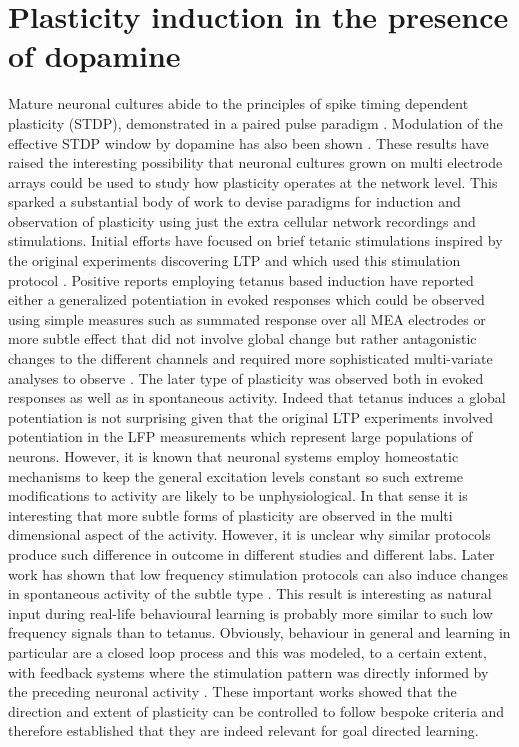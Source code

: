     \section{Plasticity induction in the presence of dopamine}
    Mature neuronal cultures abide to the principles of spike timing dependent plasticity (STDP), demonstrated in a paired pulse paradigm \cite{bi1998synaptic}. Modulation of the effective STDP window by dopamine has also been shown \cite{zhang2009gain}. These results have raised the interesting possibility that neuronal cultures grown on multi electrode arrays could be used to study how plasticity operates at the network level. This sparked a substantial body of work to devise paradigms for induction and observation of plasticity using just the extra cellular network recordings and stimulations. Initial efforts have focused on brief tetanic stimulations inspired by the original experiments discovering LTP and which used this stimulation protocol \cite{bliss1973long}. Positive reports employing tetanus based induction have reported either a generalized potentiation in evoked responses which could be observed using simple measures such as summated response over all MEA electrodes \cite{chiappalone2008network,hamilton2015time,ruaro2005toward} or more subtle effect that did not involve global change but rather antagonistic changes to the different channels and required more sophisticated multi-variate analyses to observe \cite{jimbo1999simultaneous,le2015repeated,madhavan2007plasticity}. The later type of plasticity was observed both in evoked responses as well as in spontaneous activity. Indeed that tetanus induces a global potentiation is not surprising given that the original LTP experiments involved potentiation in the LFP measurements which represent large populations of neurons. However, it is known that neuronal systems employ homeostatic mechanisms to keep the general excitation levels constant \cite{turrigiano1999homeostatic} so such extreme modifications to activity are likely to be unphysiological. In that sense it is interesting that more subtle forms of plasticity are observed in the multi dimensional aspect of the activity. However, it is unclear why similar protocols produce such difference in outcome in different studies and different labs. Later work has shown that low frequency stimulation protocols can also induce changes in spontaneous activity of the subtle type \cite{le2015repeated,vajda2008low}. This result is interesting as natural input during real-life behavioural learning is probably more similar to such low frequency signals than to tetanus. Obviously, behaviour in general and learning in particular are a closed loop process and this was modeled, to a certain extent, with feedback systems where the stimulation pattern was directly informed by the preceding neuronal activity \cite{bakkum2008spatio,shahaf2001learning}. These important works showed that the direction and extent of plasticity can be controlled to follow bespoke criteria and therefore established that they are indeed relevant for goal directed learning.

